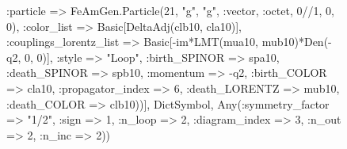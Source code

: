 \documentclass{revtex4}
\begin{document}
\begin{figure}[!htb]
\begin{center}
{:particle => FeAmGen.Particle(21, "g", "g", :vector, :octet, 0//1, 0, 0), :color_list => Basic[DeltaAdj(clb10, cla10)], :couplings_lorentz_list => Basic[-im*LMT(mua10, mub10)*Den(-q2, 0, 0)], :style => "Loop", :birth_SPINOR => spa10, :death_SPINOR => spb10, :momentum => -q2, :birth_COLOR => cla10, :propagator_index => 6, :death_LORENTZ => mub10, :death_COLOR => clb10))], Dict{Symbol, Any}(:symmetry_factor => "1/2", :sign => 1, :n_loop => 2, :diagram_index => 3, :n_out => 2, :n_inc => 2)) 
}
\end{center}
\end{figure}
\end{document}
